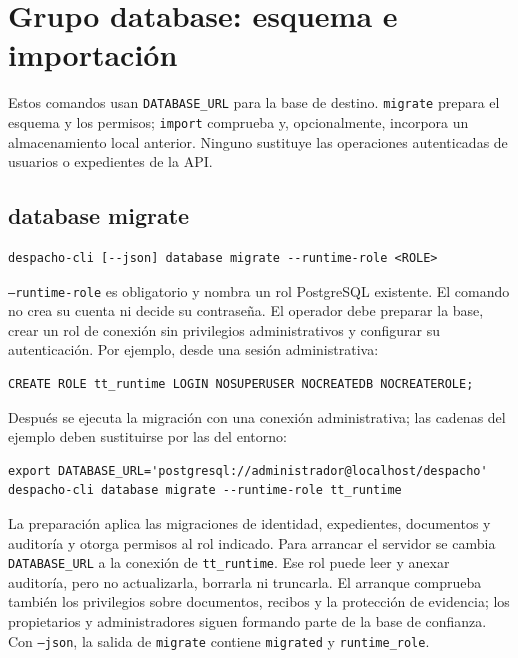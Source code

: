 \section{Grupo database: esquema e importación}\label{sec:cli-database}

Estos comandos usan \texttt{DATABASE\_URL} para la base de destino.
\texttt{migrate} prepara el esquema y los permisos; \texttt{import} comprueba
y, opcionalmente, incorpora un almacenamiento local anterior. Ninguno sustituye
las operaciones autenticadas de usuarios o expedientes de la API.

\subsection{database migrate}

\begin{lstlisting}[numbers=none]
despacho-cli [--json] database migrate --runtime-role <ROLE>
\end{lstlisting}

\texttt{--runtime-role} es obligatorio y nombra un rol PostgreSQL existente.
El comando no crea su cuenta ni decide su contraseña. El operador debe preparar
la base, crear un rol de conexión sin privilegios administrativos y configurar
su autenticación. Por ejemplo, desde una sesión administrativa:

\begin{lstlisting}[numbers=none]
CREATE ROLE tt_runtime LOGIN NOSUPERUSER NOCREATEDB NOCREATEROLE;
\end{lstlisting}

Después se ejecuta la migración con una conexión administrativa; las cadenas
del ejemplo deben sustituirse por las del entorno:

\begin{lstlisting}[numbers=none]
export DATABASE_URL='postgresql://administrador@localhost/despacho'
despacho-cli database migrate --runtime-role tt_runtime
\end{lstlisting}

La preparación aplica las migraciones de identidad, expedientes, documentos y
auditoría y otorga permisos al rol indicado. Para arrancar el servidor se cambia
\texttt{DATABASE\_URL} a la conexión de \texttt{tt\_runtime}. Ese rol puede leer
y anexar auditoría, pero no actualizarla, borrarla ni truncarla. El arranque
comprueba también los privilegios sobre documentos, recibos y la protección
de evidencia; los propietarios y administradores siguen formando parte de
la base de confianza. Con \texttt{--json}, la salida de \texttt{migrate}
contiene \texttt{migrated} y \texttt{runtime\_role}.

